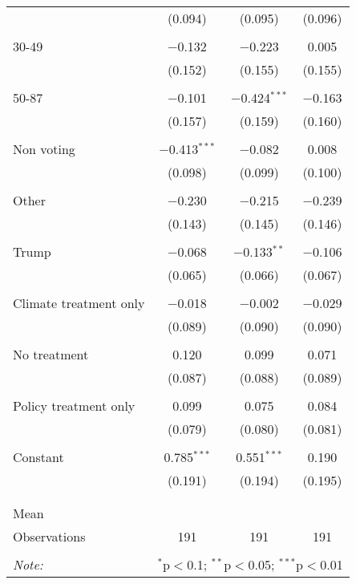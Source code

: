 \begin{tabular}{@{\extracolsep{5pt}}lccc}
  & (0.094) & (0.095) & (0.096) \\ 
  & & & \\ 
 30-49 & $-$0.132 & $-$0.223 & 0.005 \\ 
  & (0.152) & (0.155) & (0.155) \\ 
  & & & \\ 
 50-87 & $-$0.101 & $-$0.424$^{***}$ & $-$0.163 \\ 
  & (0.157) & (0.159) & (0.160) \\ 
  & & & \\ 
 Non voting & $-$0.413$^{***}$ & $-$0.082 & 0.008 \\ 
  & (0.098) & (0.099) & (0.100) \\ 
  & & & \\ 
 Other & $-$0.230 & $-$0.215 & $-$0.239 \\ 
  & (0.143) & (0.145) & (0.146) \\ 
  & & & \\ 
 Trump & $-$0.068 & $-$0.133$^{**}$ & $-$0.106 \\ 
  & (0.065) & (0.066) & (0.067) \\ 
  & & & \\ 
 Climate treatment only & $-$0.018 & $-$0.002 & $-$0.029 \\ 
  & (0.089) & (0.090) & (0.090) \\ 
  & & & \\ 
 No treatment & 0.120 & 0.099 & 0.071 \\ 
  & (0.087) & (0.088) & (0.089) \\ 
  & & & \\ 
 Policy treatment only & 0.099 & 0.075 & 0.084 \\ 
  & (0.079) & (0.080) & (0.081) \\ 
  & & & \\ 
 Constant & 0.785$^{***}$ & 0.551$^{***}$ & 0.190 \\ 
  & (0.191) & (0.194) & (0.195) \\ 
  & & & \\ 
\hline \\[-1.8ex] 
Mean &  &  &  \\ 
Observations & 191 & 191 & 191 \\ 
\hline 
\hline \\[-1.8ex] 
\textit{Note:}  & \multicolumn{3}{r}{$^{*}$p$<$0.1; $^{**}$p$<$0.05; $^{***}$p$<$0.01} \\ 
\end{tabular} 
